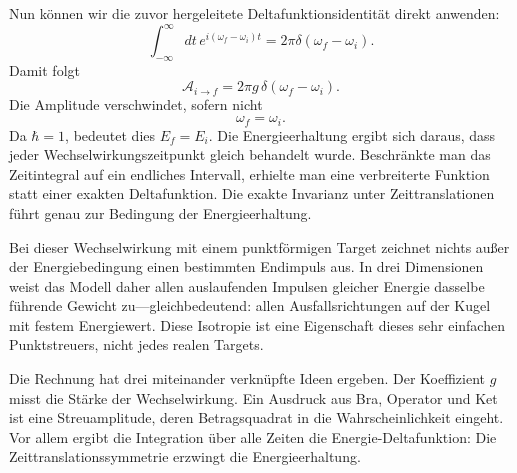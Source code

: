 Nun können wir die zuvor hergeleitete Deltafunktionsidentität direkt anwenden:
\begin{equation}
\int_{-\infty}^{\infty}dt\,
e^{i(\omega_f-\omega_i)t}
=2\pi\delta(\omega_f-\omega_i).
\end{equation}
Damit folgt
\begin{equation}
\boxed{
\mathcal A_{i\to f}
=2\pi g\,\delta(\omega_f-\omega_i)
}.
\end{equation}
Die Amplitude verschwindet, sofern nicht
\begin{equation}
\omega_f=\omega_i.
\end{equation}
Da \(\hbar=1\), bedeutet dies \(E_f=E_i\). Die Energieerhaltung ergibt sich daraus, dass jeder Wechselwirkungszeitpunkt gleich behandelt wurde. Beschränkte man das Zeitintegral auf ein endliches Intervall, erhielte man eine verbreiterte Funktion statt einer exakten Deltafunktion. Die exakte Invarianz unter Zeittranslationen führt genau zur Bedingung der Energieerhaltung.

\begin{classroomqa}
\end{classroomqa}


Bei dieser Wechselwirkung mit einem punktförmigen Target zeichnet nichts außer der Energiebedingung einen bestimmten Endimpuls aus. In drei Dimensionen weist das Modell daher allen auslaufenden Impulsen gleicher Energie dasselbe führende Gewicht zu---gleichbedeutend: allen Ausfallsrichtungen auf der Kugel mit festem Energiewert. Diese Isotropie ist eine Eigenschaft dieses sehr einfachen Punktstreuers, nicht jedes realen Targets.

Die Rechnung hat drei miteinander verknüpfte Ideen ergeben. Der Koeffizient \(g\) misst die Stärke der Wechselwirkung. Ein Ausdruck aus Bra, Operator und Ket ist eine Streuamplitude, deren Betragsquadrat in die Wahrscheinlichkeit eingeht. Vor allem ergibt die Integration über alle Zeiten die Energie-Deltafunktion: Die Zeittranslationssymmetrie erzwingt die Energieerhaltung.

